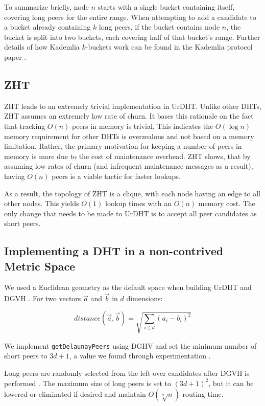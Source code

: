 To summarize briefly, node $n$ starts with a single bucket containing itself, covering long peers for the entire range.
When attempting to add a candidate to a bucket already containing $k$ long peers, if the bucket contains node $n$, the bucket is split into two buckets, each covering half of that bucket's range.
Further details of how Kademlia $k$-buckets work can be found in the Kademlia protocol paper \cite{kademlia}.


\subsection{ZHT}
ZHT \cite{li2013zht} leads to an extremely trivial implementation in UrDHT.
Unlike other DHTs, ZHT assumes an extremely low rate of churn.
It bases this rationale on the fact that tracking $ O(n) $ peers in memory is trivial.
This indicates the $ O( \log n)  $  memory  requirement for other DHTs is overzealous and not based on a memory limitation.
Rather, the primary motivation for keeping a number of peers in memory is more due to the cost of maintenance overhead.
ZHT shows, that by assuming low rates of churn (and infrequent maintenance messages as a result), having $O(n)$ peers is a viable tactic for faster lookups.

As a result, the topology of ZHT is a clique, with each node having an edge to all other nodes.
This yields $ O(1) $ lookup times with an $ O(n) $ memory cost.
The only change that needs to be made to UrDHT is to accept all peer candidates as short peers.

\subsection{Implementing a DHT in a non-contrived Metric Space}

We used a Euclidean geometry as the default space when building UrDHT and DGVH \cite{dgvh}.
For two vectors $\vec{a}$ and $\vec{b}$ in $d$ dimensions: 

\[distance\left(\vec{a}, \vec{b}\right) = \sqrt{\sum\limits_{i\in d} \left(a_i-b_i\right)^2}\]


We implement \texttt{getDelaunayPeers} using DGHV and set the minimum number of short peers to $3d+1$, a value we found through experimentation \cite{dgvh}.

Long peers are randomly selected from the left-over candidates after DGVH is performed \cite{dgvh}.
The maximum size of long peers is set to $(3d+1)^2$, but it can be lowered or eliminated if desired and maintain $ O(\sqrt[d]{n}) $ routing time.


